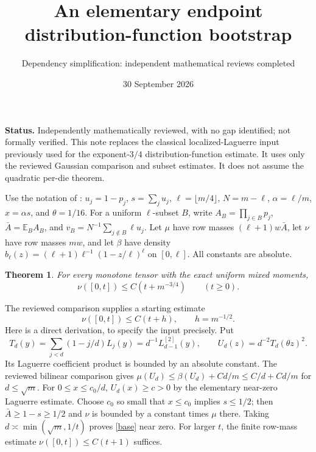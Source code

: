 \documentclass[11pt]{article}
\title{An elementary endpoint distribution-function bootstrap}
\author{Dependency simplification: independent mathematical reviews completed}
\date{30 September 2026}
\newtheorem{theorem}{Theorem}
\newcommand{\E}{\mathbb E}
\begin{document}
\maketitle
\noindent\textbf{Status.} Independently mathematically reviewed, with no
gap identified; not formally verified.
This note replaces the classical localized-Laguerre input previously
used for the exponent-$3/4$ distribution-function estimate. It uses
only the reviewed Gaussian comparison and subset estimates. It does
not assume the quadratic per-die theorem.

Use the notation of :
$u_j=1-p_j$, $s=\sum_j u_j$, $\ell=\lfloor m/4\rfloor$,
$N=m-\ell$, $\alpha=\ell/m$, $x=\alpha s$, and $\theta=1/16$.
For a uniform $\ell$-subset $B$, write
$A_B=\prod_{j\in B}p_j$, $\bar A=\E_B A_B$,
and $v_B=N^{-1}\sum_{j\notin B}\ell u_j$.
Let $\mu$ have row masses $(\ell+1)w\bar A$, let $\nu$ have row
masses $mw$, and let $\beta$ have density
$b_\ell(z)=(\ell+1)\ell^{-1}(1-z/\ell)^\ell$ on $[0,\ell]$.
All constants are absolute.

\begin{theorem}\label{main}
For every monotone tensor with the exact uniform mixed moments,
\[
 \nu([0,t])\le C(t+m^{-3/4})\qquad(t\ge0).
\]
\end{theorem}

The reviewed comparison supplies a starting estimate
\begin{equation}\label{base}
 \nu([0,t])\le C(t+h),\qquad h=m^{-1/2}.
\end{equation}
Here is a direct derivation, to specify the input precisely. Put
\[
 T_d(y)=\sum_{j<d}(1-j/d)L_j(y)=d^{-1}L_{d-1}^{[2]}(y),
 \qquad U_d(z)=d^{-2}T_d(\theta z)^2.
\]
Its Laguerre coefficient product is bounded by an absolute constant.
The reviewed bilinear comparison gives
$\mu(U_d)\le\beta(U_d)+Cd/m\le C/d+Cd/m$ for $d\le\sqrt m$.
For $0\le x\le c_0/d$, $U_d(x)\ge c>0$ by the elementary
near-zero Laguerre estimate. Choose $c_0$ so small that $x\le c_0$
implies $s\le1/2$; then $\bar A\ge1-s\ge1/2$ and $\nu$ is bounded
by a constant times $\mu$ there. Taking
$d\asymp\min(\sqrt m,1/t)$ proves \eqref{base} near zero. For larger
$t$, the finite row-mass estimate $\nu([0,t])\le C(t+1)$ suffices.
\end{document}
